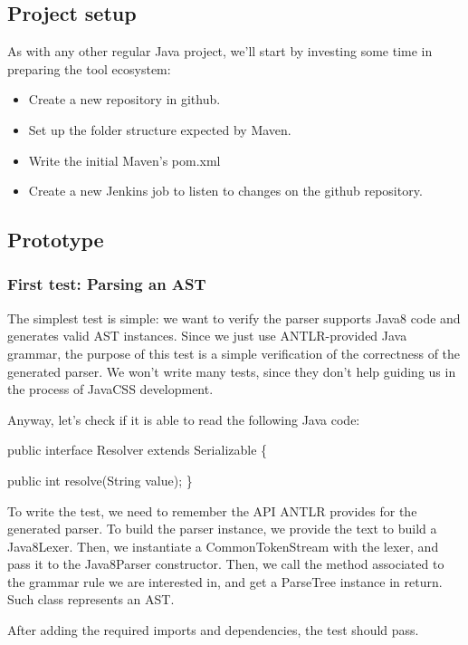 \documentclass[11pt]{article}
\begin{document}
\subsection{Project setup}
\label{sec-1-2}

As with any other regular Java project, we'll start by investing some time in preparing the tool ecosystem:

\begin{itemize}
\item Create a new repository in github.
\item Set up the folder structure expected by Maven.
\item Write the initial Maven's pom.xml
\item Create a new Jenkins job to listen to changes on the github repository.
\end{itemize}

\subsection{Prototype}
\label{sec-1-3}

\subsubsection{First test: Parsing an AST}
\label{sec-1-3-1}

The simplest test is simple: we want to verify the parser supports Java8 code and generates valid AST instances.
Since we just use ANTLR-provided Java grammar, the purpose of this test is a simple verification of the correctness of
the generated parser. We won't write many tests, since they don't help guiding us in the process of JavaCSS development.

Anyway, let's check if it is able to read the following Java code:

public interface Resolver
    extends Serializable \{

    public int resolve(String value);
\}

To write the test, we need to remember the API ANTLR provides for the generated parser. To build the parser instance,
we provide the text to build a Java8Lexer. Then, we instantiate a CommonTokenStream with the lexer, and pass it to the Java8Parser constructor.
Then, we call the method associated to the grammar rule we are interested in, and
get a ParseTree instance in return. Such class represents an AST.

After adding the required imports and dependencies, the test should pass.
\end{document}
